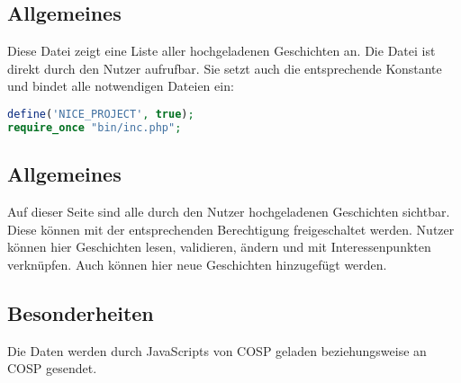 \subsection{Allgemeines} Diese Datei zeigt eine Liste aller hochgeladenen Geschichten an.
Die Datei ist direkt durch den Nutzer aufrufbar. Sie setzt auch die entsprechende Konstante und bindet alle notwendigen Dateien ein:
\begin{lstlisting}[language=php]
define('NICE_PROJECT', true);
require_once "bin/inc.php";
\end{lstlisting}
\subsection{Allgemeines}
Auf dieser Seite sind alle durch den Nutzer hochgeladenen Geschichten sichtbar. Diese können mit der entsprechenden Berechtigung freigeschaltet werden. Nutzer können hier Geschichten lesen, validieren, ändern und mit Interessenpunkten verknüpfen. Auch können hier neue Geschichten hinzugefügt werden.
\subsection{Besonderheiten}
Die Daten werden durch JavaScripts von {\glqq COSP\grqq} geladen beziehungsweise an {\glqq COSP\grqq} gesendet.
